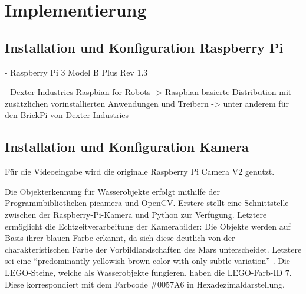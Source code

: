 \chapter{Implementierung}
\label{chp:implementierung}

\section{Installation und Konfiguration Raspberry Pi}
\label{sec:inst_konf_raspi}

- Raspberry Pi 3 Model B Plus Rev 1.3

- Dexter Industries Raspbian for Robots -> Raspbian-basierte Distribution mit zusätzlichen vorinstallierten Anwendungen und Treibern -> unter anderem für den BrickPi von Dexter Industries

\section{Installation und Konfiguration Kamera}
\label{sec:inst_konf_kamera}

Für die Videoeingabe wird die originale Raspberry Pi Camera V2 genutzt.

Die Objekterkennung für Wasserobjekte erfolgt mithilfe der Programmbibliotheken picamera und OpenCV.
Erstere stellt eine Schnittstelle zwischen der Raspberry-Pi-Kamera und Python zur Verfügung.
Letztere ermöglicht die Echtzeitverarbeitung der Kamerabilder:
Die Objekte werden auf Basis ihrer blauen Farbe erkannt, da sich diese deutlich von der charakteristischen Farbe der Vorbildlandschaften des Mars unterscheidet.
Letztere sei eine \enquote{predominantly yellowish brown color with only subtle variation} \cite{maki1999}.
Die LEGO-Steine, welche als Wasserobjekte fungieren, haben die LEGO-Farb-ID $7$.
Diese korrespondiert mit dem Farbcode \#0057A6 in Hexadezimaldarstellung.